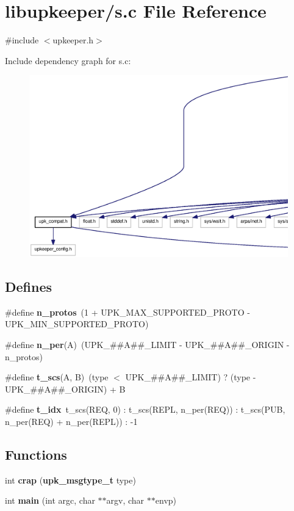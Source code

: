 \section{libupkeeper/s.c File Reference}
\label{s_8c}
{\ttfamily \#include $<$upkeeper.h$>$}\par
Include dependency graph for s.c:
\nopagebreak
\begin{figure}[H]
\begin{center}
\leavevmode
\includegraphics[width=400pt]{s_8c__incl}
\end{center}
\end{figure}
\subsection*{Defines}
\begin{DoxyCompactItemize}
\item 
\#define {\bf n\_\-protos}~(1 + UPK\_\-MAX\_\-SUPPORTED\_\-PROTO -\/ UPK\_\-MIN\_\-SUPPORTED\_\-PROTO)
\item 
\#define {\bf n\_\-per}(A)~(UPK\_\-\#\#A\#\#\_\-LIMIT -\/ UPK\_\-\#\#A\#\#\_\-ORIGIN -\/ n\_\-protos)
\item 
\#define {\bf t\_\-scs}(A, B)~(type $<$ UPK\_\-\#\#A\#\#\_\-LIMIT) ? (type -\/ UPK\_\-\#\#A\#\#\_\-ORIGIN) + B
\item 
\#define {\bf t\_\-idx}~t\_\-scs(REQ, 0) : t\_\-scs(REPL, n\_\-per(REQ)) : t\_\-scs(PUB, n\_\-per(REQ) + n\_\-per(REPL)) : -\/1
\end{DoxyCompactItemize}
\subsection*{Functions}
\begin{DoxyCompactItemize}
\item 
int {\bf crap} ({\bf upk\_\-msgtype\_\-t} type)
\item 
int {\bf main} (int argc, char $\ast$$\ast$argv, char $\ast$$\ast$envp)
\end{DoxyCompactItemize}


